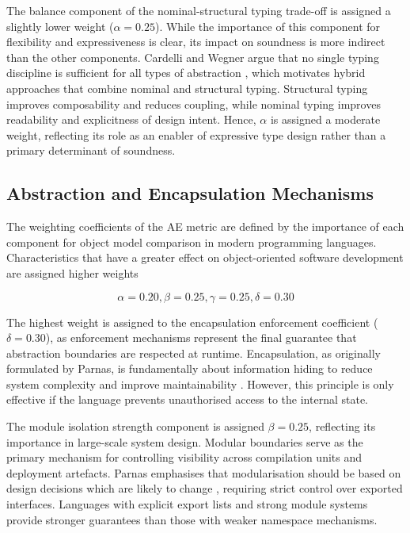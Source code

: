 The balance component of the nominal-structural typing trade-off is assigned a slightly lower weight ($\alpha = 0.25$). While the importance of this component for flexibility and expressiveness is clear, its impact on soundness is more indirect than the other components. Cardelli and Wegner argue that no single typing discipline is sufficient for all types of abstraction \cite{cardelli1985understanding}, which motivates hybrid approaches that combine nominal and structural typing. Structural typing improves composability and reduces coupling, while nominal typing improves readability and explicitness of design intent. Hence, $\alpha$ is assigned a moderate weight, reflecting its role as an enabler of expressive type design rather than a primary determinant of soundness.

\subsection{Abstraction and Encapsulation Mechanisms}

The weighting coefficients of the AE metric are defined by the importance of each component for object model comparison in modern programming languages. Characteristics that have a greater effect on object-oriented software development are assigned higher weights

\[
    \alpha = 0.20, \beta = 0.25, \gamma = 0.25, \delta = 0.30
\]

The highest weight is assigned to the encapsulation enforcement coefficient ($\delta = 0.30$), as enforcement mechanisms represent the final guarantee that abstraction boundaries are respected at runtime. Encapsulation, as originally formulated by Parnas, is fundamentally about information hiding to reduce system complexity and improve maintainability \cite{parnas1972criteria}. However, this principle is only effective if the language prevents unauthorised access to the internal state. 

The module isolation strength component is assigned $\beta = 0.25$, reflecting its importance in large-scale system design. Modular boundaries serve as the primary mechanism for controlling visibility across compilation units and deployment artefacts. Parnas emphasises that modularisation should be based on design decisions which are likely to change \cite{parnas1972criteria}, requiring strict control over exported interfaces. Languages with explicit export lists and strong module systems provide stronger guarantees than those with weaker namespace mechanisms.

